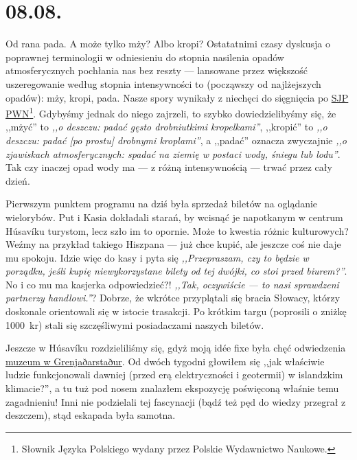 \chapter*{08.08.}

Od rana pada. A może tylko mży? Albo kropi? Ostatatnimi czasy dyskusja o poprawnej terminologii w odniesieniu do stopnia nasilenia opadów atmosferycznych pochłania nas bez reszty --- lansowane przez większość uszeregowanie według stopnia intensywności to (począwszy od najlżejszych opadów): mży, kropi, pada. Nasze spory wynikały z niechęci do sięgnięcia po \href{http://sjp.pwn.pl/}{SJP PWN}\footnote{Słownik Języka Polskiego wydany przez Polskie Wydawnictwo Naukowe.}. Gdybyśmy jednak do niego zajrzeli, to szybko dowiedzielibyśmy się, że ,,mżyć'' to \emph{,,o deszczu: padać gęsto drobniutkimi kropelkami''}, ,,kropić'' to \emph{,,o deszczu: padać [po prostu] drobnymi kroplami''}, a ,,padać'' oznacza zwyczajnie \emph{,,o zjawiskach atmosferycznych: spadać na ziemię w postaci wody, śniegu lub lodu''}. Tak czy inaczej opad wody ma --- z różną intensywnością --- trwać przez cały dzień.

Pierwszym punktem programu na dziś była sprzedaż biletów na oglądanie wielorybów. Put i Kasia dokładali starań, by wcisnąć je napotkanym w centrum Húsavíku turystom, lecz szło im to opornie. Może to kwestia różnic kulturowych? Weźmy na przykład takiego Hiszpana --- już chce kupić, ale jeszcze coś nie daje mu spokoju. Idzie więc do kasy i pyta się \emph{,,Przepraszam, czy to będzie w porządku, jeśli kupię niewykorzystane bilety od tej dwójki, co stoi przed biurem?''}. No i co mu ma kasjerka odpowiedzieć?! \emph{,,Tak, oczywiście --- to nasi sprawdzeni partnerzy handlowi.''}? Dobrze, że wkrótce przyplątali się bracia Słowacy, którzy doskonale orientowali się w istocie trasakcji. Po krótkim targu (poprosili o zniżkę 1000~kr) stali się szczęśliwymi posiadaczami naszych biletów.


Jeszcze w Húsavíku rozdzieliliśmy się, gdyż moją idée fixe była chęć odwiedzenia \href{http://www.visithusavik.com/attractions/the-turf-house-museum/}{muzeum w Grenjaðarstaður}. Od dwóch tygodni głowiłem się ,,jak właściwie ludzie funkcjonowali dawniej (przed erą elektryczności i geotermii) w islandzkim klimacie?'', a tu tuż pod nosem znalazłem ekspozycję poświęconą właśnie temu zagadnieniu! Inni nie podzielali tej fascynacji (bądź też pęd do wiedzy przegrał z deszczem), stąd eskapada była samotna.

